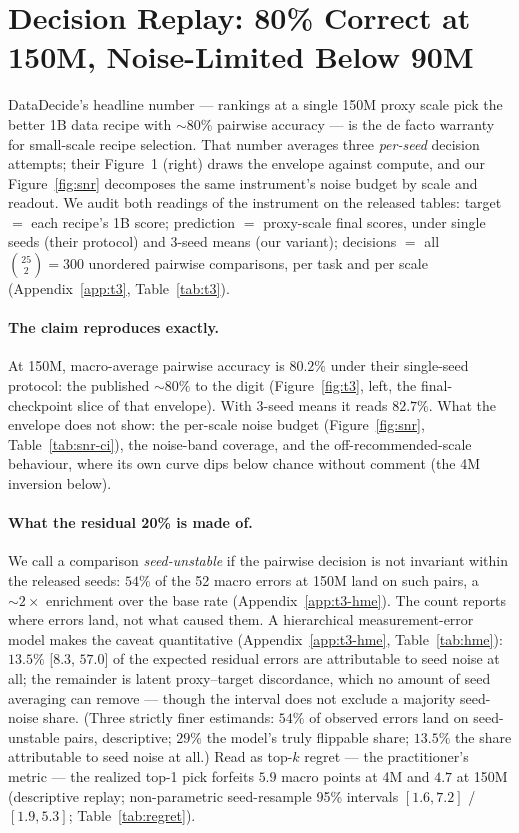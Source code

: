 
\section{Decision Replay: 80\% Correct at 150M, Noise-Limited Below 90M}
\label{sec:t3}

DataDecide's headline number --- rankings at a single 150M proxy scale pick the better 1B data
recipe with ${\sim}80\%$ pairwise accuracy --- is the de facto warranty for small-scale recipe
selection. That number averages three \emph{per-seed} decision attempts; their Figure~1
(right) draws the envelope against compute, and our Figure~\ref{fig:snr} decomposes
the same instrument's noise budget by scale and readout. We audit both
readings of the instrument on the
released tables: target $=$ each
recipe's 1B score; prediction $=$ proxy-scale final scores, under single seeds (their
protocol) and 3-seed means (our variant); decisions $=$ all $\binom{25}{2} = 300$ unordered
pairwise comparisons, per task and per scale (Appendix~\ref{app:t3}, Table~\ref{tab:t3}).

\paragraph{The claim reproduces exactly.}
\label{sec:t3-repro}
At 150M, macro-average pairwise accuracy is $80.2\%$ under their single-seed protocol: the
published ${\sim}80\%$ to the digit (Figure~\ref{fig:t3}, left, the final-checkpoint slice of
that envelope). With 3-seed means it reads $82.7\%$. What the envelope does not show: the
per-scale noise budget (Figure~\ref{fig:snr}, Table~\ref{tab:snr-ci}), the noise-band coverage, and the off-recommended-scale behaviour, where its own curve dips below chance without comment (the 4M
inversion below).

\paragraph{What the residual 20\% is made of.}
\label{sec:t3-decomp}
We call a comparison \emph{seed-unstable} if the pairwise decision is not invariant within
the released seeds: $54\%$ of the 52 macro errors at 150M land on such pairs, a ${\sim}2\times$
enrichment over the base rate (Appendix~\ref{app:t3-hme}). The
count reports where errors land, not what caused them.
A hierarchical measurement-error model makes the caveat quantitative (Appendix~\ref{app:t3-hme},
Table~\ref{tab:hme}): $13.5\%$ [$8.3$, $57.0$] of the expected residual errors are
attributable to seed noise at all; the remainder is latent proxy--target discordance, which
no amount of seed averaging can remove --- though the interval does not exclude a majority
seed-noise share. (Three strictly finer estimands: $54\%$ of observed errors land on
seed-unstable pairs, descriptive; $29\%$ the model's truly flippable share; $13.5\%$ the
share attributable to seed noise at all.) Read as top-$k$ regret --- the
practitioner's metric --- the realized top-1 pick forfeits $5.9$ macro
points at 4M and $4.7$ at 150M (descriptive replay; non-parametric seed-resample 95\%
intervals $[1.6, 7.2]$ / $[1.9, 5.3]$; Table~\ref{tab:regret}).


